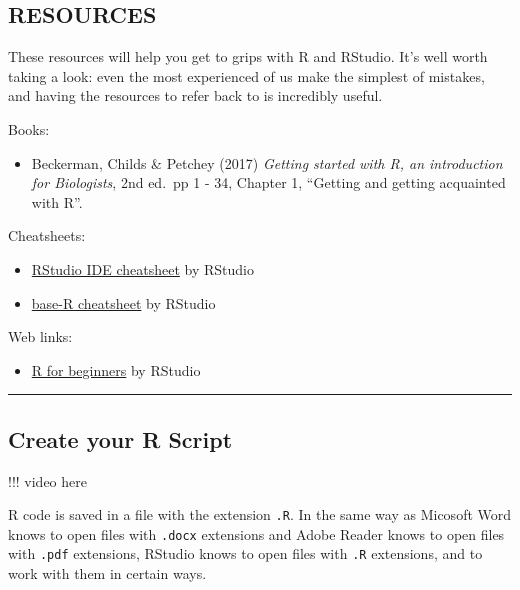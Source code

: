 \documentclass[
]{book}
\providecommand{\tightlist}{%
  \setlength{\itemsep}{0pt}\setlength{\parskip}{0pt}}
\begin{document}
\hypertarget{resources}{%
\subsection{RESOURCES}\label{resources}}

These resources will help you get to grips with R and RStudio. It's well worth
taking a look: even the most experienced of us make the simplest of mistakes,
and having the resources to refer back to is incredibly useful.

Books:

\begin{itemize}
\tightlist
\item
  Beckerman, Childs \& Petchey (2017) \emph{Getting started with R, an
  introduction for Biologists}, 2nd ed.~pp 1 - 34, Chapter 1, ``Getting and
  getting acquainted with R''.
  ~
\end{itemize}

Cheatsheets:

\begin{itemize}
\tightlist
\item
  \href{https://github.com/rstudio/cheatsheets/raw/master/rstudio-ide.pdf}{RStudio IDE cheatsheet} by RStudio
\item
  \href{http://github.com/rstudio/cheatsheets/raw/master/base-r.pdf}{base-R cheatsheet} by RStudio
  ~
\end{itemize}

Web links:

\begin{itemize}
\tightlist
\item
  \href{https://education.rstudio.com/learn/beginner}{R for beginners} by RStudio\\
  \hspace*{0.333em}
\end{itemize}

\begin{center}\rule{0.5\linewidth}{\linethickness}\end{center}

\hypertarget{create-your-r-script}{%
\subsection{Create your R Script}\label{create-your-r-script}}

!!! video here

R code is saved in a file with the extension \texttt{.R}. In the same way as Micosoft
Word knows to open files with \texttt{.docx} extensions and Adobe Reader knows to
open files with \texttt{.pdf} extensions, RStudio knows to open files with \texttt{.R}
extensions, and to work with them in certain ways.
\end{document}
